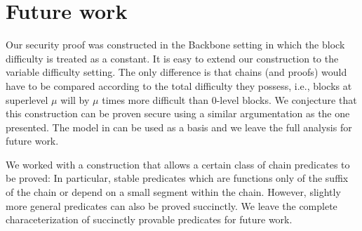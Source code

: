 \section{Future work}

Our security proof was constructed in the Backbone \cite{backbone} setting in
which the block difficulty is treated as a constant. 
It is easy to extend our construction to the variable difficulty setting. 
The only difference is that chains (and proofs) 
would have to be compared according to the total difficulty they possess, i.e., 
blocks at superlevel $\mu$ will by $\mu$ times more difficult
than $0$-level blocks. We conjecture
that this construction can be proven secure using a similar argumentation
as the one presented. The model in
\cite{backbone2} can be used as a basis and   we leave the full analysis  for
future work.

We worked with a construction that allows a certain class of chain predicates
to be proved: In particular, stable predicates which are functions only of the
 suffix of the chain or depend on a small segment within the chain. However, slightly more general
predicates can also be proved succinctly. We leave the complete characeterization
of succinctly provable predicates for future work.
